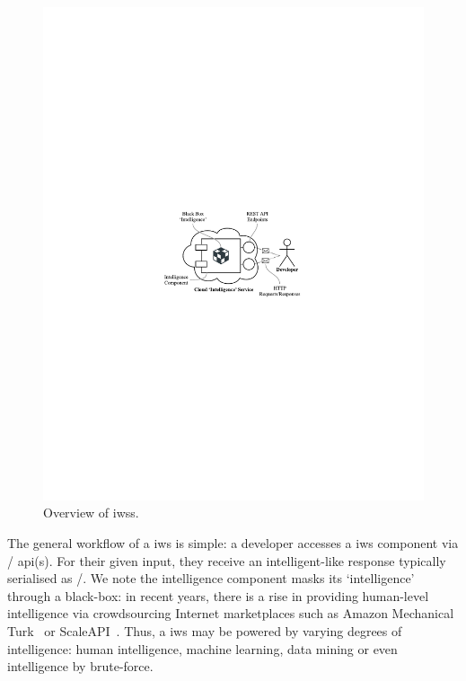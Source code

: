 \begin{figure}[h!]
\centering
\caption[Overview of intelligent web services]{Overview of \glspl{iws}.}
\label{fig:introduction:cloud-intelliegnce-service}
\includegraphics{cloud-intelliegnce-service}
\end{figure}

 
The general workflow of a \gls{iws} is  simple: a developer accesses a \gls{iws} component via / \gls{api}(s). For their given input, they receive an intelligent-like response typically serialised as /. We note the intelligence component masks its `intelligence' through a black-box: in recent years, there is a rise in providing human-level intelligence via crowdsourcing Internet marketplaces such as Amazon Mechanical Turk~ or ScaleAPI~. Thus, a \gls{iws} may be powered by varying degrees of intelligence: human intelligence, machine learning, data mining or even intelligence by brute-force.

